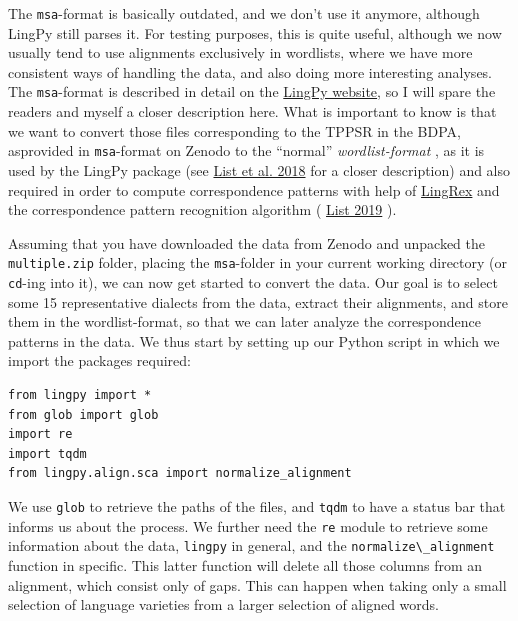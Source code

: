 \documentclass[
  a4paper,
  14pt,
  oneside,
  tablecaptionabove
]{scrbook}
\newcommand{\passthrough}[1]{#1}
\begin{document}
The \passthrough{\lstinline!msa!}-format is basically outdated, and we
don't use it anymore, although LingPy still parses it. For testing
purposes, this is quite useful, although we now usually tend to use
alignments exclusively in wordlists, where we have more consistent ways
of handling the data, and also doing more interesting analyses. The
\passthrough{\lstinline!msa!}-format is described in detail on the
\href{http://lingpy.org/tutorial/formats.html\#multiple-alignments-msq-and-msa}{LingPy
website}, so I will spare the readers and myself a closer description
here. What is important to know is that we want to convert those files
corresponding to the TPPSR in the BDPA, asprovided in
\passthrough{\lstinline!msa!}-format on Zenodo to the \enquote{normal}
\emph{wordlist-format} , as it is used by the LingPy package (see
\href{http://bibliography.lingpy.org?key=List2018d}{List et al. 2018}
for a closer description) and also required in order to compute
correspondence patterns with help of
\href{https://github.com/lingpy/lingrex}{LingRex} and the correspondence
pattern recognition algorithm (
\href{http://bibliography.lingpy.org?key=List2019a}{List 2019} ).

Assuming that you have downloaded the data from Zenodo and unpacked the
\passthrough{\lstinline!multiple.zip!} folder, placing the
\passthrough{\lstinline!msa!}-folder in your current working directory
(or \passthrough{\lstinline!cd!}-ing into it), we can now get started to
convert the data. Our goal is to select some 15 representative dialects
from the data, extract their alignments, and store them in the
wordlist-format, so that we can later analyze the correspondence
patterns in the data. We thus start by setting up our Python script in
which we import the packages required:

\begin{lstlisting}
from lingpy import *
from glob import glob
import re
import tqdm
from lingpy.align.sca import normalize_alignment
\end{lstlisting}

We use \passthrough{\lstinline!glob!} to retrieve the paths of the
files, and \passthrough{\lstinline!tqdm!} to have a status bar that
informs us about the process. We further need the
\passthrough{\lstinline!re!} module to retrieve some information about
the data, \passthrough{\lstinline!lingpy!} in general, and the
\passthrough{\lstinline!normalize\_alignment!} function in specific.
This latter function will delete all those columns from an alignment,
which consist only of gaps. This can happen when taking only a small
selection of language varieties from a larger selection of aligned
words.
\end{document}
